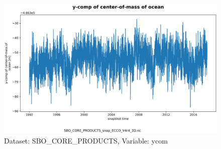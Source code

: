 \begin{figure}[H]
\centering
\includegraphics[scale=0.55]{../images/plots/v4r4/oneD_plots/SBO_Core_Products/ycom.png}
\caption{Dataset: SBO\_CORE\_PRODUCTS, Variable: ycom}
\label{tab:table-SBO_CORE_PRODUCTS_ycom-Plot}
\end{figure}
\newpage
\pagebreak
